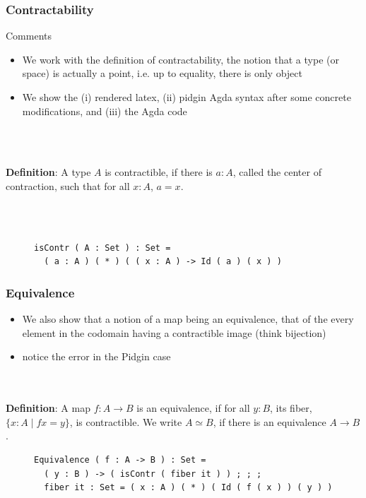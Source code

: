\documentclass[9pt]{beamer}
\newcommand{\equalH}[2]{#1 = #2}
\newcommand{\comprehensionH}[3]{\{ #1 : #2 \mid #3 \}}
\newcommand{\arrowH}[2]{#1 \rightarrow #2}
\newcommand{\appH}[2]{#1 #2}
\newcommand{\equivalenceH}[2]{#1 \simeq #2}
\newcommand{\equalH}[2]{#1 = #2}
\newcommand{\comprehensionH}[3]{\{ #1 : #2 \mid #3 \}}
\newcommand{\arrowH}[2]{#1 \rightarrow #2}
\newcommand{\appH}[2]{#1 #2}
\newcommand{\equivalenceH}[2]{#1 \simeq #2}
\begin{document}
\begin{frame}[fragile]
\frametitle{Contractability}

\begin{block}{Comments}
\begin{itemize}
\item We work with the definition of contractability, the notion that a type (or space) is
actually a point, i.e. up to equality, there is only object
\item We show the (i) rendered latex, (ii)  pidgin Agda syntax after some concrete
  modifications, and (iii) the Agda code
\end{itemize}\\~\\
\end{block}

\textbf{Definition}:
A type $A$ is contractible, if there is $a : A$, called the center of contraction, such that for all $x : A$, $\equalH {a}{x}$.

\\~\\
\begin{figure}
\begin{verbatim}
isContr ( A : Set ) : Set = 
  ( a : A ) ( * ) ( ( x : A ) -> Id ( a ) ( x ) )
\end{verbatim}
\end{figure}

% 

\end{frame}

\begin{frame}[fragile]
\frametitle{Equivalence}
\begin{itemize}
\item We also show that a notion of a map being an equivalence, that of the
  every element in the codomain having a contractible image (think bijection) 
\item notice the error in the Pidgin case
\end{itemize}

\\~\\

 \textbf{Definition}:
 A map $f : \arrowH {A}{B}$ is an equivalence, if for all $y : B$, its fiber, $\comprehensionH {x}{A}{\equalH {\appH {f}{x}}{y}}$, is contractible.
 We write $\equivalenceH {A}{B}$, if there is an equivalence $\arrowH {A}{B}$.


\begin{figure}
\begin{verbatim}
Equivalence ( f : A -> B ) : Set = 
  ( y : B ) -> ( isContr ( fiber it ) ) ; ; ; 
  fiber it : Set = ( x : A ) ( * ) ( Id ( f ( x ) ) ( y ) )
\end{verbatim}
\end{figure}

% 
\end{frame}
\end{document}
